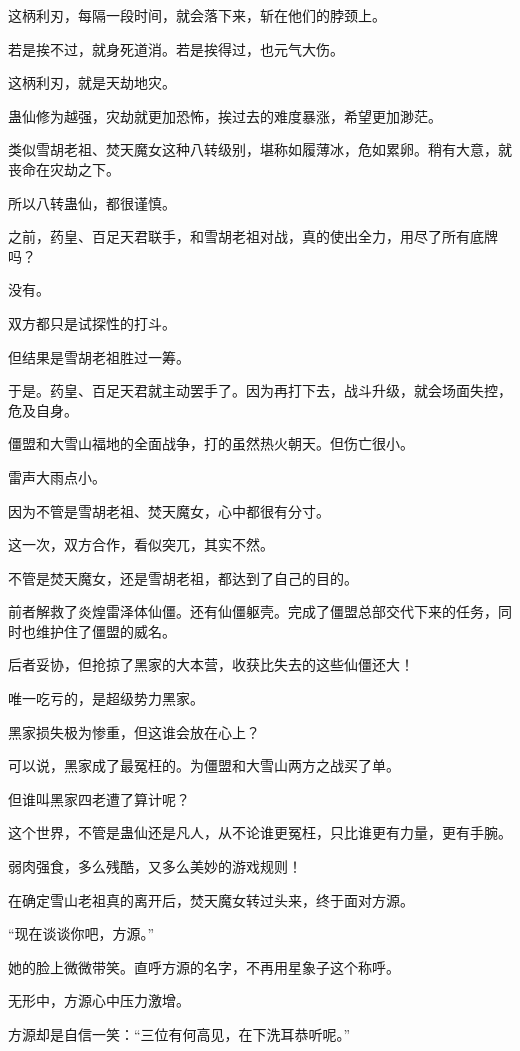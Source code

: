 \begin{this_body}
这柄利刃，每隔一段时间，就会落下来，斩在他们的脖颈上。

若是挨不过，就身死道消。若是挨得过，也元气大伤。

这柄利刃，就是天劫地灾。

蛊仙修为越强，灾劫就更加恐怖，挨过去的难度暴涨，希望更加渺茫。

类似雪胡老祖、焚天魔女这种八转级别，堪称如履薄冰，危如累卵。稍有大意，就丧命在灾劫之下。

所以八转蛊仙，都很谨慎。

之前，药皇、百足天君联手，和雪胡老祖对战，真的使出全力，用尽了所有底牌吗？

没有。

双方都只是试探性的打斗。

但结果是雪胡老祖胜过一筹。

于是。药皇、百足天君就主动罢手了。因为再打下去，战斗升级，就会场面失控，危及自身。

僵盟和大雪山福地的全面战争，打的虽然热火朝天。但伤亡很小。

雷声大雨点小。

因为不管是雪胡老祖、焚天魔女，心中都很有分寸。

这一次，双方合作，看似突兀，其实不然。

不管是焚天魔女，还是雪胡老祖，都达到了自己的目的。

前者解救了炎煌雷泽体仙僵。还有仙僵躯壳。完成了僵盟总部交代下来的任务，同时也维护住了僵盟的威名。

后者妥协，但抢掠了黑家的大本营，收获比失去的这些仙僵还大！

唯一吃亏的，是超级势力黑家。

黑家损失极为惨重，但这谁会放在心上？

可以说，黑家成了最冤枉的。为僵盟和大雪山两方之战买了单。

但谁叫黑家四老遭了算计呢？

这个世界，不管是蛊仙还是凡人，从不论谁更冤枉，只比谁更有力量，更有手腕。

弱肉强食，多么残酷，又多么美妙的游戏规则！

在确定雪山老祖真的离开后，焚天魔女转过头来，终于面对方源。

“现在谈谈你吧，方源。”

她的脸上微微带笑。直呼方源的名字，不再用星象子这个称呼。

无形中，方源心中压力激增。

方源却是自信一笑：“三位有何高见，在下洗耳恭听呢。”


\end{this_body}
